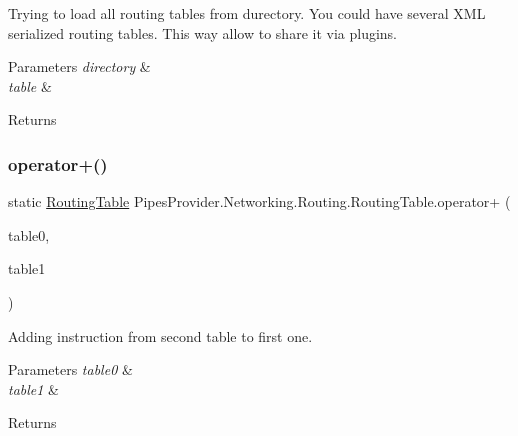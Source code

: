 Trying to load all routing tables from durectory. You could have several X\+ML serialized routing tables. This way allow to share it via plugins. 


\begin{DoxyParams}{Parameters}
{\em directory} & \\
\hline
{\em table} & \\
\hline
\end{DoxyParams}
\begin{DoxyReturn}{Returns}

\end{DoxyReturn}
\mbox{\label{class_pipes_provider_1_1_networking_1_1_routing_1_1_routing_table_a515b9ad19dc868afb6d47c762064fd96}} 
\subsubsection{\texorpdfstring{operator+()}{operator+()}}
{\footnotesize\ttfamily static \mbox{\hyperlink{class_pipes_provider_1_1_networking_1_1_routing_1_1_routing_table}{Routing\+Table}} Pipes\+Provider.\+Networking.\+Routing.\+Routing\+Table.\+operator+ (\begin{DoxyParamCaption}\item[{\mbox{\hyperlink{class_pipes_provider_1_1_networking_1_1_routing_1_1_routing_table}{Routing\+Table}}}]{table0,  }\item[{\mbox{\hyperlink{class_pipes_provider_1_1_networking_1_1_routing_1_1_routing_table}{Routing\+Table}}}]{table1 }\end{DoxyParamCaption})\hspace{0.3cm}{\ttfamily [static]}}



Adding instruction from second table to first one. 


\begin{DoxyParams}{Parameters}
{\em table0} & \\
\hline
{\em table1} & \\
\hline
\end{DoxyParams}
\begin{DoxyReturn}{Returns}

\end{DoxyReturn}
\mbox{\label{class_pipes_provider_1_1_networking_1_1_routing_1_1_routing_table_afa326622fc49d66bcd375c08b2f6ff8b}} 
